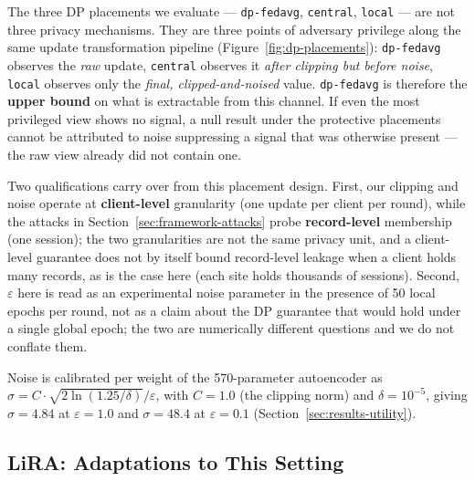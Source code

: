 The three DP placements we evaluate --- \texttt{dp-fedavg},
\texttt{central}, \texttt{local} --- are not three privacy mechanisms.
They are three points of adversary privilege along the same update
transformation pipeline (Figure~\ref{fig:dp-placements}):
\texttt{dp-fedavg} observes the \emph{raw} update, \texttt{central}
observes it \emph{after clipping but before noise}, \texttt{local}
observes only the \emph{final, clipped-and-noised} value.
\texttt{dp-fedavg} is therefore the \textbf{upper bound} on what is
extractable from this channel. If even the most privileged view shows
no signal, a null result under the protective placements cannot be
attributed to noise suppressing a signal that was otherwise present ---
the raw view already did not contain one.

Two qualifications carry over from this placement design. First, our
clipping and noise operate at \textbf{client-level} granularity (one
update per client per round), while the attacks in
Section~\ref{sec:framework-attacks} probe \textbf{record-level}
membership (one session); the two granularities are not the same
privacy unit, and a client-level guarantee does not by itself bound
record-level leakage when a client holds many records, as is the case
here (each site holds thousands of sessions). Second, $\varepsilon$
here is read as an experimental noise parameter in the presence of 50
local epochs per round, not as a claim about the DP guarantee that
would hold under a single global epoch; the two are numerically
different questions and we do not conflate them.

Noise is calibrated per weight of the 570-parameter autoencoder as
$\sigma = C \cdot \sqrt{2 \ln(1.25/\delta)} / \varepsilon$, with
$C = 1.0$ (the clipping norm) and $\delta = 10^{-5}$, giving
$\sigma = 4.84$ at $\varepsilon = 1.0$ and $\sigma = 48.4$ at
$\varepsilon = 0.1$ (Section~\ref{sec:results-utility}).

\subsection{LiRA: Adaptations to This Setting}
\label{sec:framework-lira}

